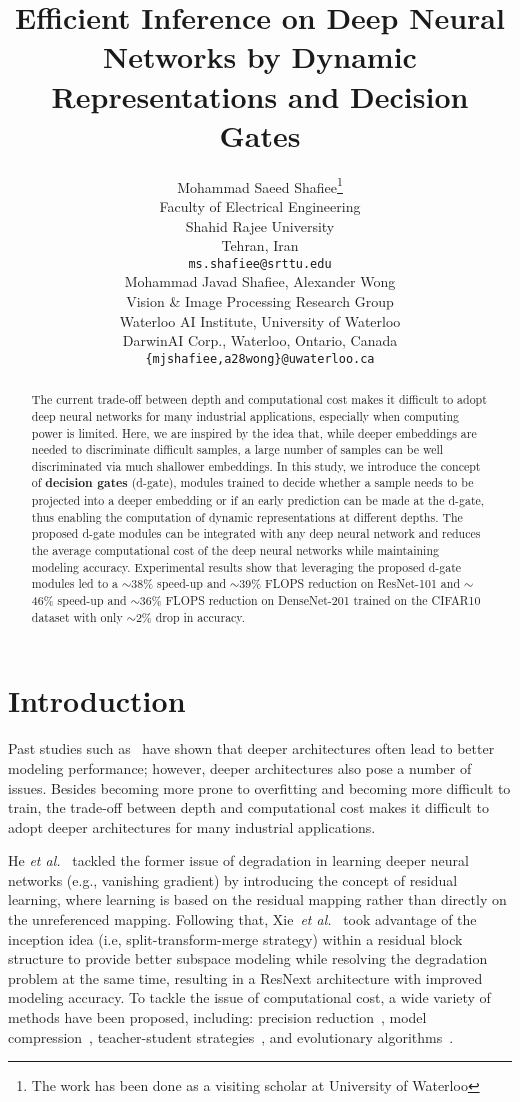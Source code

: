 \documentclass{article}
\title{Efficient Inference on Deep Neural Networks by Dynamic Representations and Decision Gates }
\author{
  Mohammad Saeed Shafiee\thanks{The work has been done as a visiting scholar at University of Waterloo} \\
  Faculty of Electrical Engineering\\
  Shahid Rajee University\\
  Tehran, Iran\\
  \texttt{ms.shafiee@srttu.edu} \\
  \And
  Mohammad Javad Shafiee, Alexander Wong \\
  Vision \& Image Processing Research Group\\
  Waterloo AI Institute, University of Waterloo \\
  DarwinAI Corp., Waterloo, Ontario, Canada\\
  \texttt{\{mjshafiee,a28wong\}@uwaterloo.ca} \\
}
\begin{document}

\maketitle
\vspace{-0.3 cm}
\begin{abstract}
\vspace{-0.3 cm}
 The current trade-off between depth and computational cost makes it difficult to adopt deep neural networks for many industrial applications, especially when computing power is limited. Here, we are inspired by the idea that, while deeper embeddings are needed to discriminate difficult samples, a large number of samples can be well discriminated via much shallower embeddings. In this study, we introduce the concept of \textbf{decision gates} (d-gate), modules trained to decide whether a sample needs to be projected into a deeper embedding or if an early prediction can be made at the d-gate, thus enabling the computation of dynamic representations at different depths.  The proposed d-gate modules can be integrated with any deep neural network and reduces the average computational cost of the deep neural networks while maintaining modeling accuracy. Experimental results show that leveraging the proposed d-gate modules led to a $\sim$38\% speed-up and $\sim$39\% FLOPS reduction on ResNet-101 and $\sim$46\% speed-up and $\sim$36\% FLOPS reduction on DenseNet-201 trained on the CIFAR10 dataset with only $\sim$2\% drop in accuracy.
\end{abstract}
\vspace{-0.4 cm}
\section{Introduction}
\vspace{-0.4 cm}
Past studies such as~\cite{simonyan2014very} have shown that deeper architectures often lead to better modeling performance; however, deeper architectures also pose a number of issues.  Besides becoming more prone to overfitting and becoming more difficult to train, the trade-off between depth and computational cost makes it difficult to adopt deeper architectures for many industrial applications.

He {\it et al.}~\cite{he2016deep} tackled the former issue of degradation in learning deeper neural networks (e.g., vanishing gradient) by introducing the concept of residual learning, where learning is based on the residual mapping rather than directly on the unreferenced mapping.  Following that, Xie~{\it et al.}~\cite{xie2017aggregated} took advantage of the inception idea (i.e, split-transform-merge strategy) within a residual block structure to provide better subspace modeling while resolving the degradation problem at the same time, resulting in a ResNext architecture with improved modeling accuracy.  To tackle the issue of computational cost, a wide variety of methods have been proposed, including: precision reduction~\cite{jacob2017quantization},  model compression~\cite{han2015deep}, teacher-student strategies~\cite{hinton2015distilling}, and evolutionary algorithms~\cite{javad2016evonet,shafiee2016evolutionary}.
\end{document}
